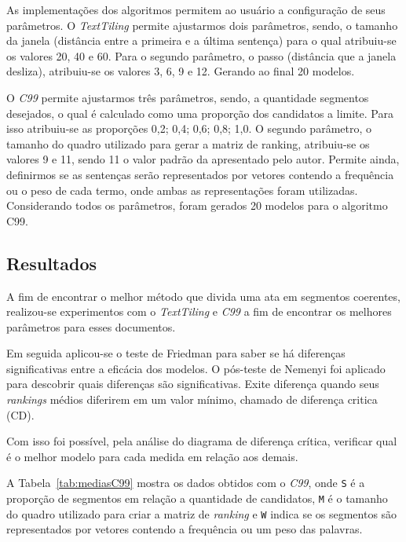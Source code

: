 As implementações dos algoritmos permitem ao usuário a configuração de seus parâmetros. 
%
O \textit{TextTiling} permite ajustarmos dois parâmetros, sendo, o tamanho da janela (distância entre a primeira e a última sentença) para o qual atribuiu-se os valores 20, 40 e 60. Para o segundo parâmetro, o passo (distância que a janela desliza), atribuiu-se os valores 3, 6, 9 e 12. Gerando ao final 20 modelos.
%

O \textit{C99} permite ajustarmos três parâmetros, sendo, a quantidade segmentos desejados, o qual é calculado como uma proporção dos candidatos a limite. Para isso atribuiu-se as proporções {0,2; 0,4; 0,6; 0,8; 1,0}. O segundo parâmetro, o tamanho do quadro utilizado para gerar a matriz de ranking, atribuiu-se os valores 9 e 11, sendo 11 o valor padrão da apresentado pelo autor. Permite ainda, definirmos se as sentenças serão representados por vetores contendo a frequência ou o peso de cada termo, onde ambas as representações foram utilizadas.
%
 Considerando todos os parâmetros, foram gerados 20 modelos para o algoritmo C99.%


\subsection{Resultados}
	\label{subsec:resultados}

A fim de encontrar o melhor método que divida uma ata em segmentos coerentes, realizou-se experimentos com o \textit{TextTiling} e \textit{C99} a fim de encontrar os melhores parâmetros para esses documentos.

Em seguida aplicou-se o teste de Friedman para saber se há diferenças significativas entre a eficácia dos modelos. O pós-teste de Nemenyi foi aplicado para descobrir quais diferenças são significativas. 
%
Exite diferença quando seus \textit{rankings} médios diferirem em um valor mínimo, chamado de diferença critica (CD). 
%

% 
Com isso foi possível, pela análise do diagrama de diferença crítica, verificar qual é o melhor modelo para cada medida
em relação aos demais. 

A Tabela~\ref{tab:mediasC99} mostra os dados obtidos com o \textit{C99}, onde \texttt{S} é a proporção de segmentos em relação a quantidade de candidatos, \texttt{M} é o tamanho do quadro utilizado para criar a matriz de \textit{ranking} e \texttt{W} indica se os segmentos são representados por vetores contendo a frequência ou um peso das palavras. 



